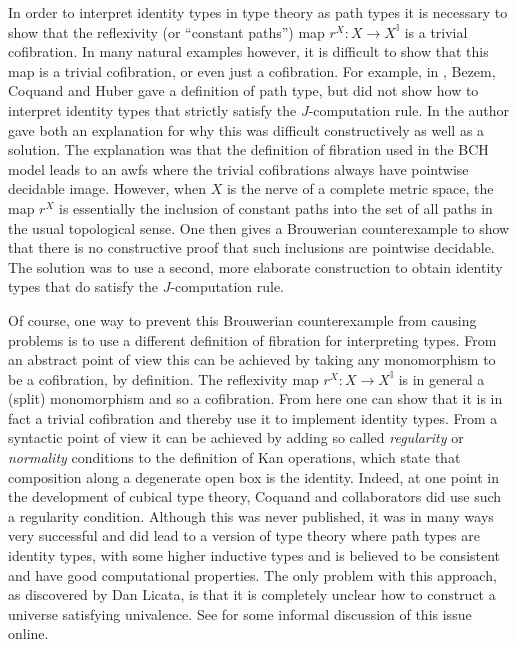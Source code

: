 \documentclass[a4paper]{amsart}
\theoremstyle{definition}
\newcommand{\intv}{\mathbb{I}}
\begin{document}
In order to interpret identity types in type theory as path types it
is necessary to show that the reflexivity (or ``constant paths'') map
$r^X \colon X \to X^\intv$ is a trivial cofibration. In many
natural examples however, it is difficult to show that this map
is a trivial cofibration, or even
just a cofibration. For example, in \cite{bchcubicalsets}, Bezem, Coquand
and Huber gave a definition of path type, but did not show how to
interpret identity types that strictly satisfy the $J$-computation
rule. In \cite{swannomawfs} the author gave both an explanation for
why this was difficult constructively as well as a solution. The
explanation was that the definition of fibration used in the BCH model
leads to an awfs where the trivial cofibrations always have pointwise
decidable image. However, when $X$ is the nerve of a complete metric
space, the map $r^X$ is essentially the inclusion of constant paths into
the set of all paths in the usual topological sense. One then gives a
Brouwerian counterexample to show that there is no constructive proof
that such inclusions are pointwise decidable. The solution was to use a
second, more elaborate construction to obtain identity types that do
satisfy the $J$-computation rule.

Of course, one way to prevent this Brouwerian counterexample from
causing problems is to use a different definition of fibration for
interpreting types. From an abstract point of view this can be
achieved by taking any monomorphism to be a cofibration, by
definition. The reflexivity map $r^X \colon X \to X^\intv$ is in
general a (split) monomorphism and so a cofibration. From here one can
show that it is in fact a trivial cofibration and thereby use it to
implement identity types. From a syntactic point of view it can be
achieved by adding so called \emph{regularity} or \emph{normality}
conditions to the definition of Kan operations, which state that
composition along a degenerate open box is the identity. Indeed, at
one point in the development of cubical type theory, Coquand and
collaborators did use such a regularity condition. Although this was
never published, it was in many ways very successful and did lead to a
version of type theory where path types are identity types, with some
higher inductive types and is believed to be consistent and have good
computational properties. The only problem with this approach, as
discovered by Dan Licata, is that it is completely unclear how to
construct a universe satisfying univalence. See
\cite{licataregdiscussion} for some informal discussion of this issue
online.
\end{document}
